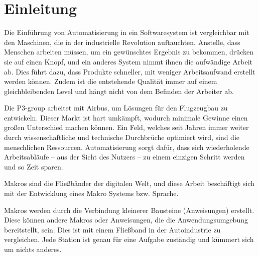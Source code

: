 

\section{Einleitung}
\label{sec:Einleitung}
  Die Einführung von Automatisierung in ein Softwaresystem ist vergleichbar mit den Maschinen, die in der industrielle Revolution auftauchten. Anstelle, dass Menschen arbeiten müssen, um ein gewünschtes Ergebnis zu bekommen, drücken sie auf einen Knopf, und ein anderes System nimmt ihnen die aufwändige Arbeit ab. Dies führt dazu, dass Produkte schneller, mit weniger Arbeitsaufwand erstellt werden können. Zudem ist die entstehende Qualität immer auf einem gleichbleibenden Level und hängt nicht von dem Befinden der Arbeiter ab.

  Die P3-group arbeitet mit Airbus, um Lösungen für den Flugzeugbau zu entwickeln. Dieser Markt ist hart umkämpft, wodurch minimale Gewinne einen großen Unterschied machen können. Ein Feld, welches seit Jahren immer weiter durch wissenschaftliche und technische Durchbrüche optimiert wird, sind die menschlichen Ressourcen. Automatisierung sorgt dafür, dass sich wiederholende Arbeitsabläufe -- aus der Sicht des Nutzers -- zu einem einzigen Schritt werden und so Zeit sparen.

  Makros sind die Fließbänder der digitalen Welt, und diese Arbeit beschäftigt sich mit der Entwicklung eines Makro Systems bzw. Sprache.

  Makros werden durch die Verbindung kleinerer Bausteine (Anweisungen) erstellt. Diese können andere Makros oder Anweisungen, die die Anwendungsumgebung bereitstellt, sein. Dies ist mit einem Fließband in der Autoindustrie zu vergleichen. Jede Station ist genau für eine Aufgabe zuständig und kümmert sich um nichts anderes.

